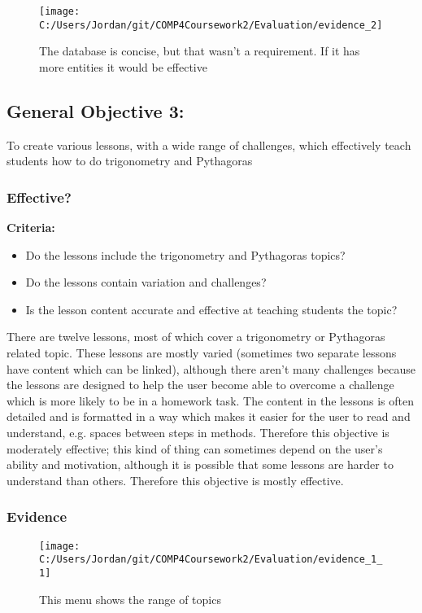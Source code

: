 \begin{figure}[H]
	\texttt{[image: C:/Users/Jordan/git/COMP4Coursework2/Evaluation/evidence\_2]}
	\caption{The database is concise, but that wasn't a requirement. If it has more entities it would be effective}
\end{figure}

\subsection{General Objective 3: }

To create various lessons, with a wide range of challenges, which effectively teach students how to do trigonometry and Pythagoras

\subsubsection{Effective?}

\textbf{Criteria: }

\begin{itemize}
	\item Do the lessons include the trigonometry and Pythagoras topics?
	\item Do the lessons contain variation and challenges?
	\item Is the lesson content accurate and effective at teaching students the topic?
\end{itemize}

There are twelve lessons, most of which cover a trigonometry or Pythagoras related topic. These lessons are mostly varied (sometimes two separate lessons have content which can be linked), although there aren't many challenges because the lessons are designed to help the user become able to overcome a challenge which is more likely to be in a homework task. The content in the lessons is often detailed and is formatted in a way which makes it easier for the user to read and understand, e.g. spaces between steps in methods. Therefore this objective is moderately effective; this kind of thing can sometimes depend on the user's ability and motivation, although it is possible that some lessons are harder to understand than others. Therefore this objective is mostly effective.

\subsubsection{Evidence}

\begin{figure}[H]
	\texttt{[image: C:/Users/Jordan/git/COMP4Coursework2/Evaluation/evidence\_1\_1]}
	\caption{This menu shows the range of topics}
\end{figure}

